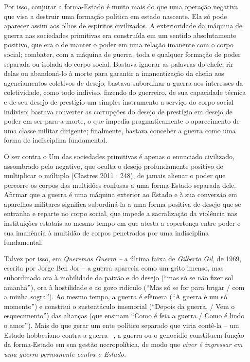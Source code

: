 Por isso, conjurar a forma-Estado é muito mais do que uma operação
negativa que visa a destruir uma formação política em estado nascente.
Ela só pode aparecer assim aos olhos de espíritos civilizados. A
exterioridade da máquina de guerra nas sociedades primitivas era
construída em um sentido absolutamente positivo, que era o de manter o
poder em uma relação imanente com o corpo social; combater, com a
máquina de guerra, toda e qualquer formação de poder separada ou isolada
do corpo social. Bastava ignorar as palavras do chefe, rir delas ou
abandoná-lo à morte para garantir a imanentização da chefia aos
agenciamentos coletivos de desejo; bastava subordinar a guerra aos
interesses da coletividade, como todo indiviso, fazendo do guerreiro, de
sua capacidade técnica e de seu desejo de prestígio um simples
instrumento a serviço do corpo social indiviso; bastava converter as
corrupções do desejo de prestígio em desejo de poder em
ser-para-a-morte, o que impedia pragmaticamente o aparecimento de uma
classe militar dirigente; finalmente, bastava conceber a guerra como uma
forma de indisciplina fundamental.

O ser contra o Um das sociedades primitivas é apenas o enunciado
civilizado, assombrado pelo negativo, que oculta o desejo profundamente
positivo de multiplicar o múltiplo (Clastres 2011 : 248), de jamais
alienar o poder que percorre os corpos das multidões confusas a uma
forma-Estado separada dele. Afirmar que a guerra é uma máquina exterior
ao Estado e à sua conversão em aparelhos militares significa
subordiná-la a uma forma positiva de desejo que se entranha e reparte no
corpo social, que impede a sacralização da violência nas instituições
estatais ao mesmo tempo em que atesta a copertença entre poder e sua
imanência à multidão de corpos penetrados por uma indisciplina
fundamental.

Talvez por isso, em \emph{Queremos Guerra -- }a última faixa de
\emph{Gilberto Gil}, de 1969, escrita por Jorge Ben Jor -- a guerra
aparecia como um grito imenso, mas subordinado ora à mobilidade da
paixão e do desejo (``mas só se não fizer sol amanhã''), ora à
hostilidade e ao gozo ridículo (``Mas só se for para brigar / com a
minha sogra''). Ao mesmo tempo, a guerra é efêmera (``A guerra é um só
momento'') e constitui o sustentáculo imemorial (``Depois da guerra, /
Vem o esquecimento'') das alianças (que ensinam ``Como é feia a guerra /
Como é lindo o amor''). Mais do que gerar um ente político separado que
viria contê-la -- um Estado hobbesiano contra a guerra --, a guerra ou o
genocídio constituem função da forma-Estado em sua gestão necropolítica,
de modo que \emph{viver é ingressar em uma guerra permanente contra o
Estado.}

